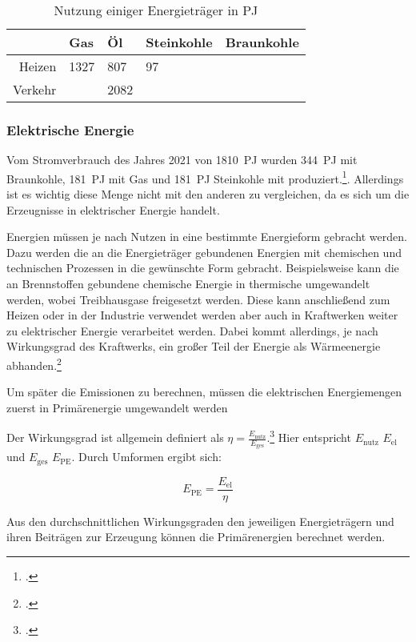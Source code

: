 \documentclass[12pt, ngerman]{article}
\newcommand{\pe}{_{\mathrm{PE}}}
\newcommand{\el}{_{\mathrm{el}}}
\begin{document}
\begin{table}[!h]
    \centering
    \begin{tabular}{r|llll}
        \toprule
                & Gas  & Öl   & Steinkohle & Braunkohle \\
        \midrule
        Heizen  & 1327 & 807  & 97         &            \\
        Verkehr &      & 2082 &            &            \\
        \bottomrule
    \end{tabular}
    \caption{Nutzung einiger Energieträger in \unit{PJ\pe}}
\end{table}

\subsubsection{Elektrische Energie}

Vom Stromverbrauch des Jahres 2021 von \qty{1810}{PJ\el} wurden \qty{344}{PJ\el} mit Braunkohle, \qty{181}{PJ\el} mit Gas
und \qty{181}{PJ\el} Steinkohle mit produziert.\footcite{SMARDEntwicklungenIm}.
Allerdings ist es wichtig diese Menge nicht mit den anderen zu vergleichen, da es sich
um die Erzeugnisse in elektrischer Energie handelt.

Energien müssen je nach Nutzen in eine bestimmte Energieform gebracht werden.
Dazu werden die an die Energieträger gebundenen Energien mit chemischen und technischen
Prozessen in die gewünschte Form gebracht.
Beispielsweise kann die an Brennstoffen gebundene chemische Energie
in thermische umgewandelt werden, wobei Treibhausgase freigesetzt werden.
Diese kann anschließend zum Heizen oder in der Industrie verwendet werden
aber auch in Kraftwerken weiter zu elektrischer Energie verarbeitet werden.
Dabei kommt allerdings, je nach Wirkungsgrad des Kraftwerks,
ein großer Teil der Energie als Wärmeenergie abhanden.\footcite{AachenHatEnergie}

Um später die Emissionen zu berechnen, müssen die elektrischen Energiemengen zuerst in
Primärenergie umgewandelt werden

Der Wirkungsgrad \unit{\eta} ist allgemein definiert als
\(\eta=\frac{E_{\mathrm{nutz}}}{E_{\mathrm{ges}}}\).\footcite{WirkungsgradLEIFIphysik}
Hier entspricht \(E\mathrm{_{nutz}}\) \(E\el\) und \(E_\mathrm{{ges}}\) \(E\pe\). Durch Umformen ergibt sich:

\[E\pe=\frac{E\el}{\eta}\]

Aus den durchschnittlichen Wirkungsgraden den jeweiligen Energieträgern und ihren Beiträgen
zur Erzeugung können die Primärenergien berechnet werden.
\end{document}
